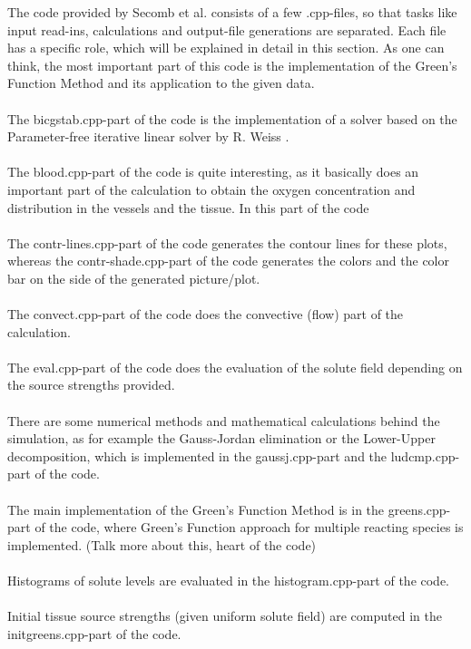 The code provided by Secomb et al. \cite{Secomb2004} consists of a few .cpp-files, so that tasks like input read-ins, calculations and output-file generations are separated. Each file has a specific role, which will be explained in detail in this section. As one can think, the most important part of this code is the implementation of the Green's Function Method and its application to the given data.
\\
\\The bicgstab.cpp-part of the code is the implementation of a solver based on the Parameter-free iterative linear solver by R. Weiss \cite{weiss1996parameter}.
\\
\\The blood.cpp-part of the code is quite interesting, as it basically does an important part of the calculation to obtain the oxygen concentration and distribution in the vessels and the tissue. In this part of the code
\\
\\The contr-lines.cpp-part of the code generates the contour lines for these plots, whereas the contr-shade.cpp-part of the code generates the colors and the color bar on the side of the generated picture/plot.
\\
\\The convect.cpp-part of the code does the convective (flow) part of the calculation.
\\
\\The eval.cpp-part of the code does the evaluation of the solute field depending on the source strengths provided.
\\
\\There are some numerical methods and mathematical calculations behind the simulation, as for example the Gauss-Jordan elimination or the Lower-Upper decomposition, which is implemented in the gaussj.cpp-part and the ludcmp.cpp-part of the code.
\\
\\The main implementation of the Green's Function Method is in the greens.cpp-part of the code, where Green's Function approach for multiple reacting species is implemented. (Talk more about this, heart of the code)
\\
\\Histograms of solute levels are evaluated in the histogram.cpp-part of the code.
\\
\\Initial tissue source strengths (given uniform solute field) are computed in the initgreens.cpp-part of the code.
